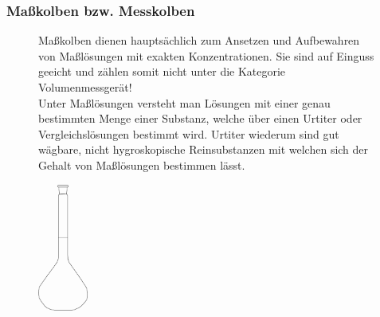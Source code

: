 \subsubsection*{Maßkolben bzw. Messkolben}
\begin{figure}[h!]
	\begin{minipage}[b]{.7\textwidth} %
		Maßkolben dienen hauptsächlich zum Ansetzen und Aufbewahren von Maßlösungen mit exakten Konzentrationen. Sie sind auf Einguss geeicht und zählen somit nicht unter die Kategorie Volumenmessgerät!\\
		{\small Unter Maßlösungen versteht man Lösungen mit einer genau bestimmten Menge einer Substanz, welche über einen Urtiter oder Vergleichslösungen bestimmt wird. Urtiter wiederum sind gut wägbare, nicht hygroskopische Reinsubstanzen mit welchen sich der Gehalt von Maßlösungen bestimmen lässt.}
	\end{minipage}
	\hspace{.1\linewidth}%
	\begin{minipage}[b]{.15\textwidth} %
		\centering
		\includegraphics[height=4.2cm]{img/Messkolben}
		\label{fig:messkolben}
	\end{minipage}
\end{figure}

\newpage

